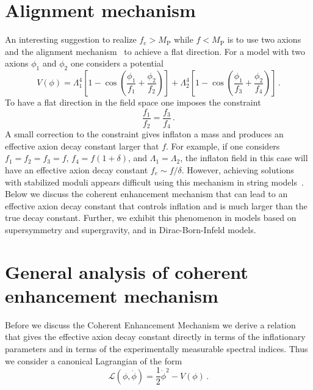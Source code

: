 \documentclass[11pt]{article}
\begin{document}
\section{Alignment mechanism \label{sec:Alignment}}
An interesting suggestion to realize $f_e > M_\text{P}$ while $f < M_\text{P}$ is to use two axions and the alignment mechanism~\cite{Kim:2004rp} to achieve a flat direction.
For a model with two axions $\phi_1$ and $\phi_2$ one considers a potential
\begin{equation} \label{eq:alignmentPotential}
  V(\phi)
    = \Lambda^4_1 \left[1 - \cos\left(\frac{\phi_1}{f_1} + \frac{\phi_2}{f_2}\right)\right]
    + \Lambda^4_2 \left[1 - \cos\left(\frac{\phi_1}{f_3} + \frac{\phi_2}{f_4}\right)\right]\,.
\end{equation}
To have a flat direction in the field space one imposes the constraint
\begin{equation} \label{eq:alignmentConstraint}
  \frac{f_1}{f_2} = \frac{f_3}{f_4}\,.
\end{equation}
A small correction to the constraint gives inflaton a mass and produces an effective axion decay constant larger that $f$.
For example, if one considers $f_1 = f_2 = f_3 = f$, $f_4 = f\left(1 + \delta\right)$, and $\Lambda_1 = \Lambda_2$, the inflaton field in this case will have an effective axion decay constant $f_e \sim f / \delta$.
However, achieving solutions with stabilized moduli appears difficult using this mechanism in string models~\cite{Long:2014dta}.
Below we discuss the coherent enhancement mechanism that can lead to an effective axion decay constant that controls inflation and is much larger than the true decay constant.
Further, we exhibit this phenomenon in models based on supersymmetry and supergravity, and in Dirac-Born-Infeld models.

\section{General analysis of coherent enhancement mechanism \label{sec:CoherentEnhancement}}
Before we discuss the Coherent Enhancement Mechanism we derive a relation that gives the effective axion decay constant directly in terms of the inflationary parameters and in terms of the experimentally measurable spectral indices.
Thus we consider a canonical Lagrangian of the form
\begin{equation}
  \mathcal{L}\left(\phi, \dot{\phi}\right) = \frac{1}{2}{\dot{\phi}}^2 - V\left(\phi\right)\,.
\end{equation}
\end{document}
